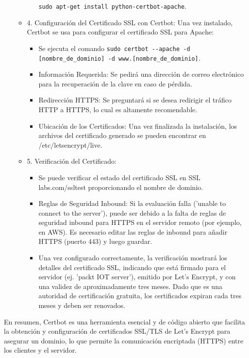 \documentclass{report}
\begin{document}
\begin{itemize}
\begin{itemize}
\begin{itemize}
            \verb|sudo apt-get install python-certbot-apache|.
        \end{itemize}
        \item 4. Configuración del Certificado SSL con Certbot: Una vez instalado, Certbot se usa para configurar el certificado SSL para Apache:
        \begin{itemize}
            \item Se ejecuta el comando \verb|sudo certbot --apache -d [nombre_de_dominio] -d www.[nombre_de_dominio]|.
            \item Información Requerida: Se pedirá una dirección de correo electrónico para la recuperación de la clave en caso de pérdida.
            \item Redirección HTTPS: Se preguntará si se desea redirigir el tráfico HTTP a HTTPS, lo cual es altamente recomendable.
            \item Ubicación de los Certificados: Una vez finalizada la instalación, los archivos del certificado generado se pueden 
            encontrar en /etc/letsencrypt/live.
        \end{itemize}
        \item 5. Verificación del Certificado:
        \begin{itemize}
            \item Se puede verificar el estado del certificado SSL en SSL labs.com/ssltest proporcionando el nombre de dominio.
            \item Reglas de Seguridad Inbound: Si la evaluación falla ('unable to connect to the server'), puede ser debido a la 
            falta de reglas de seguridad inbound para HTTPS en el servidor remoto (por ejemplo, en AWS). Es necesario editar las 
            reglas de inbound para añadir HTTPS (puerto 443) y luego guardar.
            \item Una vez configurado correctamente, la verificación mostrará los detalles del certificado SSL, indicando que está 
            firmado para el servidor (ej. 'packt IOT server'), emitido por Let's Encrypt, y con una validez de aproximadamente tres 
            meses. Dado que es una autoridad de certificación gratuita, los certificados expiran cada tres meses y deben ser renovados.
        \end{itemize}
    \end{itemize}
\end{itemize}
En resumen, Certbot es una herramienta esencial y de código abierto que facilita la obtención y configuración de certificados 
SSL/TLS de Let's Encrypt para asegurar un dominio, lo que permite la comunicación encriptada (HTTPS) entre los clientes y el servidor.
\end{document}
